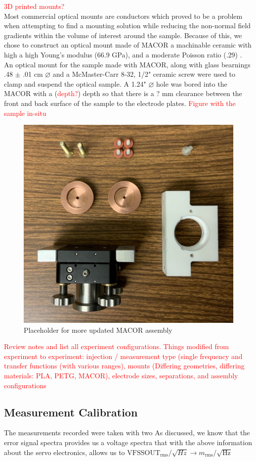 \textcolor{red}{3D printed mounts?}
\\
Most commercial optical mounts are conductors which proved to be a problem when attempting to find a mounting solution while reducing the non-normal field gradients within the volume of interest around the sample. Because of this, we chose to construct an optical mount made of MACOR a machinable ceramic with high a high Young's modulus (66.9 GPa), and a moderate Poisson ratio (.29) \cite{macor}. An optical mount for the sample made with MACOR, along with glass bearnings .48 $\pm$ .01 cm $\diameter$  and a McMaster-Carr 8-32, 1/2" ceramic screw were used to clamp and suspend the optical sample. A 1.24" $\diameter$ hole was bored into the MACOR with a (\textcolor{red}{depth?}) depth so that there is a ? mm clearance between the front and back surface of the sample to the electrode plates.
\textcolor{red}{Figure with the sample in-situ}
\\
\begin{figure}[H]
\centering
\includegraphics[width=.75\textwidth]{figs/ALGAAS/macor_assembly.jpeg}
\caption{Placeholder for more updated MACOR assembly}
\label{fig:Ez}
\end{figure}
\textcolor{red}{Review notes and list all experiment configurations. Things modified from experiment to experiment: injection / measurement type (single frequency and transfer functions (with various ranges), mounts (Differing geometries, differing materials: PLA, PETG, MACOR), electrode sizes, separations, and assembly configurations}
\subsection{Measurement Calibration}
The measurements recorded were taken with two
As discussed, we know that the error signal spectra provides us a voltage spectra that with the above information about the servo electronics, allows us to
$\mathrm{VFSSOUT}_\mathrm{rms}/\sqrt{Hz} \rightarrow m_\mathrm{rms}/\sqrt{\mathrm{Hz}}$

